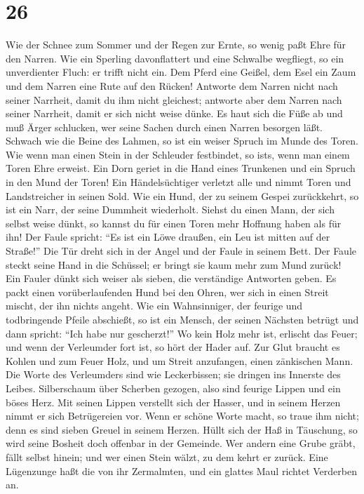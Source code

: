 \hypertarget{section-25}{%
\section{26}\label{section-25}}

 Wie der Schnee zum Sommer und der Regen zur Ernte, so
wenig paßt Ehre für den Narren.  Wie ein Sperling
davonflattert und eine Schwalbe wegfliegt, so ein unverdienter Fluch: er
trifft nicht ein.  Dem Pferd eine Geißel, dem Esel ein
Zaum und dem Narren eine Rute auf den Rücken!  Antworte
dem Narren nicht nach seiner Narrheit, damit du ihm nicht gleichest;
 antworte aber dem Narren nach seiner Narrheit, damit er
sich nicht weise dünke.  Es haut sich die Füße ab und muß
Ärger schlucken, wer seine Sachen durch einen Narren besorgen läßt.
 Schwach wie die Beine des Lahmen, so ist ein weiser
Spruch im Munde des Toren.  Wie wenn man einen Stein in
der Schleuder festbindet, so ist\textquotesingle s, wenn man einem Toren
Ehre erweist.  Ein Dorn geriet in die Hand eines Trunkenen
und ein Spruch in den Mund der Toren!  Ein
Händelsüchtiger verletzt alle und nimmt Toren und Landstreicher in
seinen Sold.  Wie ein Hund, der zu seinem Gespei
zurückkehrt, so ist ein Narr, der seine Dummheit wiederholt.
 Siehst du einen Mann, der sich selbst weise dünkt, so
kannst du für einen Toren mehr Hoffnung haben als für ihn!
 Der Faule spricht: ``Es ist ein Löwe draußen, ein Leu
ist mitten auf der Straße!''  Die Tür dreht sich in der
Angel und der Faule in seinem Bett.  Der Faule steckt
seine Hand in die Schüssel; er bringt sie kaum mehr zum Mund zurück!
 Ein Fauler dünkt sich weiser als sieben, die verständige
Antworten geben.  Es packt einen vorüberlaufenden Hund
bei den Ohren, wer sich in einen Streit mischt, der ihn nichts angeht.
 Wie ein Wahnsinniger, der feurige und todbringende
Pfeile abschießt,  so ist ein Mensch, der seinen Nächsten
betrügt und dann spricht: ``Ich habe nur gescherzt!''  Wo
kein Holz mehr ist, erlischt das Feuer; und wenn der Verleumder fort
ist, so hört der Hader auf.  Zur Glut braucht es Kohlen
und zum Feuer Holz, und um Streit anzufangen, einen zänkischen Mann.
 Die Worte des Verleumders sind wie Leckerbissen; sie
dringen ins Innerste des Leibes.  Silberschaum über
Scherben gezogen, also sind feurige Lippen und ein böses Herz.
 Mit seinen Lippen verstellt sich der Hasser, und in
seinem Herzen nimmt er sich Betrügereien vor.  Wenn er
schöne Worte macht, so traue ihm nicht; denn es sind sieben Greuel in
seinem Herzen.  Hüllt sich der Haß in Täuschung, so wird
seine Bosheit doch offenbar in der Gemeinde.  Wer andern
eine Grube gräbt, fällt selbst hinein; und wer einen Stein wälzt, zu dem
kehrt er zurück.  Eine Lügenzunge haßt die von ihr
Zermalmten, und ein glattes Maul richtet Verderben an.

